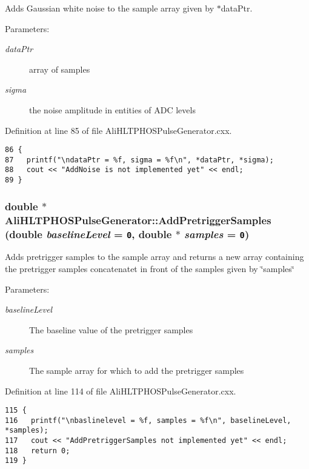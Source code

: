 Adds Gaussian white noise to the sample array given by $\ast$data\-Ptr. \begin{Desc}
\item[Parameters:]
\begin{description}
\item[{\em data\-Ptr}]array of samples \item[{\em sigma}]the noise amplitude in entities of ADC levels \end{description}
\end{Desc}


Definition at line 85 of file Ali\-HLTPHOSPulse\-Generator.cxx.

\footnotesize\begin{verbatim}86 {
87   printf("\ndataPtr = %f, sigma = %f\n", *dataPtr, *sigma);
88   cout << "AddNoise is not implemented yet" << endl;
89 }
\end{verbatim}\normalsize 


\subsubsection{\setlength{\rightskip}{0pt plus 5cm}double $\ast$ Ali\-HLTPHOSPulse\-Generator::Add\-Pretrigger\-Samples (double {\em baseline\-Level} = {\tt 0}, double $\ast$ {\em samples} = {\tt 0})}\label{classAliHLTPHOSPulseGenerator_a8}


Adds pretrigger samples to the sample array and returns a new array containing the pretrigger samples concatenatet in front of the samples given by \char`\"{}samples\char`\"{} \begin{Desc}
\item[Parameters:]
\begin{description}
\item[{\em baseline\-Level}]The baseline value of the pretrigger samples \item[{\em samples}]The sample array for which to add the pretrigger samples \end{description}
\end{Desc}


Definition at line 114 of file Ali\-HLTPHOSPulse\-Generator.cxx.

\footnotesize\begin{verbatim}115 {
116   printf("\nbaslinelevel = %f, samples = %f\n", baselineLevel, *samples);
117   cout << "AddPretriggerSamples not implemented yet" << endl;
118   return 0;
119 }
\end{verbatim}\normalsize 


